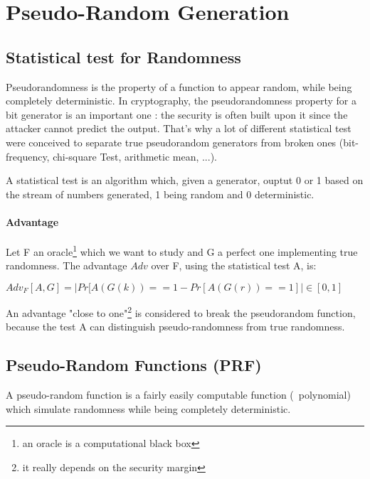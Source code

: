 \section{ Pseudo-Random Generation }

\subsection{Statistical test for Randomness}

Pseudorandomness is the property of a function to appear random, while being completely deterministic. In cryptography, the pseudorandomness property for a bit generator is an important one : the security is often built upon it since the attacker cannot predict the output. That's why a lot of different statistical test were conceived to separate true pseudorandom generators from broken ones (bit-frequency, chi-square Test, arithmetic mean, ...).

\begin{mydef}
A statistical test is an algorithm which, given a generator, ouptut 0 or 1 based on the stream of numbers generated, 1 being random and 0 deterministic.
\end{mydef}

\paragraph{Advantage \\}
\label{sec:advantage}

Let F an oracle\footnote{an oracle is a computational black box} which we want to study and G a perfect one implementing true randomness. The advantage $Adv$ over F, using the statistical test A, is: 
\begin{mydef}
$Adv_{F} [A,G] = | Pr[A(G(k)) == 1  - Pr[A(G(r)) == 1] | \in  [0,1] $
\end{mydef}

An advantage "close to one"\footnote{it really depends on the security margin} is considered to break the pseudorandom function, because the test A can distinguish pseudo-randomness from true randomness.


\subsection{Pseudo-Random Functions   (PRF)}

A pseudo-random function is a fairly easily computable function (~polynomial) which simulate randomness while being completely deterministic.

